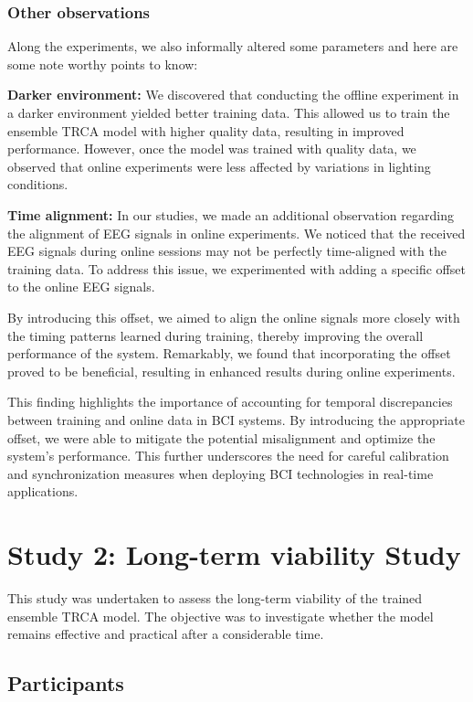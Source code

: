 \subsubsection{Other observations}
Along the experiments, we also informally altered some parameters and here are some note worthy points to know:

\textbf{Darker environment:} We discovered that conducting the offline experiment in a darker environment yielded better training data. This allowed us to train the ensemble TRCA model with higher quality data, resulting in improved performance. However, once the model was trained with quality data, we observed that online experiments were less affected by variations in lighting conditions. 

\textbf{Time alignment:} In our studies, we made an additional observation regarding the alignment of EEG signals in online experiments. We noticed that the received EEG signals during online sessions may not be perfectly time-aligned with the training data. To address this issue, we experimented with adding a specific offset to the online EEG signals.

By introducing this offset, we aimed to align the online signals more closely with the timing patterns learned during training, thereby improving the overall performance of the system. Remarkably, we found that incorporating the offset proved to be beneficial, resulting in enhanced results during online experiments.

This finding highlights the importance of accounting for temporal discrepancies between training and online data in BCI systems. By introducing the appropriate offset, we were able to mitigate the potential misalignment and optimize the system's performance. This further underscores the need for careful calibration and synchronization measures when deploying BCI technologies in real-time applications.

\section{Study 2: Long-term viability Study}

This study was undertaken to assess the long-term viability of the trained ensemble TRCA model. The objective was to investigate whether the model remains effective and practical after a considerable time.

\subsection{Participants}

